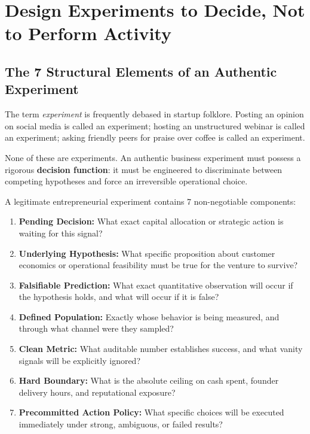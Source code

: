 \section{Design Experiments to Decide, Not to Perform Activity}

\subsection{The 7 Structural Elements of an Authentic Experiment}

The term \textit{experiment} is frequently debased in startup folklore. Posting an opinion on social media is called an experiment; hosting an unstructured webinar is called an experiment; asking friendly peers for praise over coffee is called an experiment.

None of these are experiments. An authentic business experiment must possess a rigorous \textbf{decision function}: it must be engineered to discriminate between competing hypotheses and force an irreversible operational choice.

A legitimate entrepreneurial experiment contains 7 non-negotiable components:
\begin{enumerate}[leftmargin=12pt,itemsep=2pt,topsep=1pt,parsep=0pt]
  \item \textbf{Pending Decision:} What exact capital allocation or strategic action is waiting for this signal?
  \item \textbf{Underlying Hypothesis:} What specific proposition about customer economics or operational feasibility must be true for the venture to survive?
  \item \textbf{Falsifiable Prediction:} What exact quantitative observation will occur if the hypothesis holds, and what will occur if it is false?
  \item \textbf{Defined Population:} Exactly whose behavior is being measured, and through what channel were they sampled?
  \item \textbf{Clean Metric:} What auditable number establishes success, and what vanity signals will be explicitly ignored?
  \item \textbf{Hard Boundary:} What is the absolute ceiling on cash spent, founder delivery hours, and reputational exposure?
  \item \textbf{Precommitted Action Policy:} What specific choices will be executed immediately under strong, ambiguous, or failed results?
\end{enumerate}

